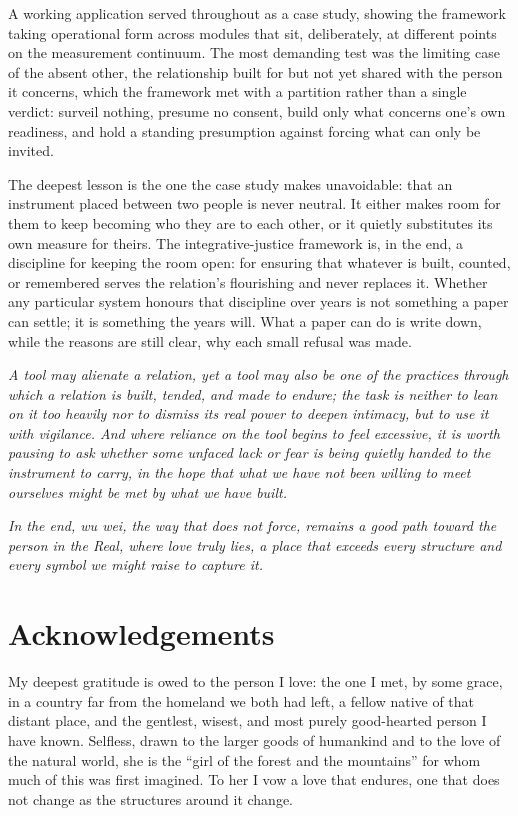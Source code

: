 A working application served throughout as a case study, showing the framework taking operational form across modules that sit, deliberately, at different points on the measurement continuum. The most demanding test was the limiting case of the absent other, the relationship built for but not yet shared with the person it concerns, which the framework met with a partition rather than a single verdict: surveil nothing, presume no consent, build only what concerns one's own readiness, and hold a standing presumption against forcing what can only be invited.

The deepest lesson is the one the case study makes unavoidable: that an instrument placed between two people is never neutral. It either makes room for them to keep becoming who they are to each other, or it quietly substitutes its own measure for theirs. The integrative-justice framework is, in the end, a discipline for keeping the room open: for ensuring that whatever is built, counted, or remembered serves the relation's flourishing and never replaces it. Whether any particular system honours that discipline over years is not something a paper can settle; it is something the years will. What a paper can do is write down, while the reasons are still clear, why each small refusal was made.

{\color{warnred}\itshape A tool may alienate a relation, yet a tool may also be one of the practices through which a relation is built, tended, and made to endure; the task is neither to lean on it too heavily nor to dismiss its real power to deepen intimacy, but to use it with vigilance. And where reliance on the tool begins to feel excessive, it is worth pausing to ask whether some unfaced lack or fear is being quietly handed to the instrument to carry, in the hope that what we have not been willing to meet ourselves might be met by what we have built.}

{\color{warnred}\itshape In the end, wu wei, the way that does not force, remains a good path toward the person in the Real, where love truly lies, a place that exceeds every structure and every symbol we might raise to capture it.}

\section*{Acknowledgements}

My deepest gratitude is owed to the person I love: the one I met, by some grace, in a country far from the homeland we both had left, a fellow native of that distant place, and the gentlest, wisest, and most purely good-hearted person I have known. Selfless, drawn to the larger goods of humankind and to the love of the natural world, she is the ``girl of the forest and the mountains'' for whom much of this was first imagined. To her I vow a love that endures, one that does not change as the structures around it change.

